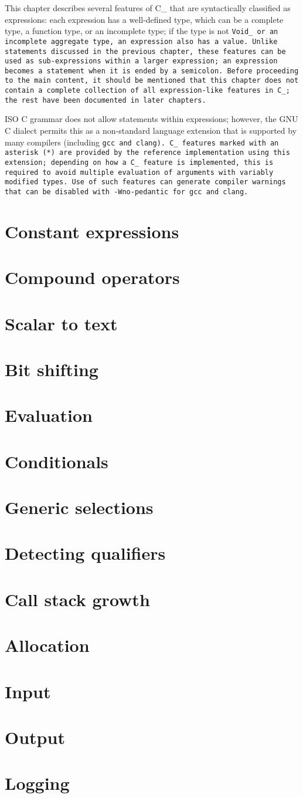 \def\Section#1{\section{#1}}

This chapter describes several features of C\_ that are syntactically classified
as expressions: each expression has a well-defined type, which can be a complete
type, a function type, or an incomplete type; if the type is not \tt{Void_}
or an incomplete aggregate type, an expression also has a value.
Unlike statements discussed in the previous chapter,
these features can be used as sub-expressions within a larger expression;
an expression becomes a statement when it is ended by a semicolon.
Before proceeding to the main content, it should be mentioned that this chapter
does not contain a complete collection of all expression-like features in C\_;
the rest have been documented in later chapters.

\note ISO C grammar does not allow statements within expressions;
however, the GNU C dialect permits this as a non-standard language extension
that is supported by many compilers (including \tt{gcc} and \tt{clang}).
C\_ features marked with an asterisk (*) are provided
by the reference implementation using this extension;
depending on how a C\_ feature is implemented, this is required to
avoid multiple evaluation of arguments with variably modified types.
Use of such features can generate compiler warnings that can be
disabled with \tt{-Wno-pedantic} for \tt{gcc} and \tt{clang}.

\Section{Constant expressions}

\Section{Compound operators}

\Section{Scalar to text}

\Section{Bit shifting}

\Section{Evaluation}

\Section{Conditionals}

\Section{Generic selections}

\Section{Detecting qualifiers}

\Section{Call stack growth}

\Section{Allocation}

\Section{Input}

\Section{Output}

\Section{Logging}
